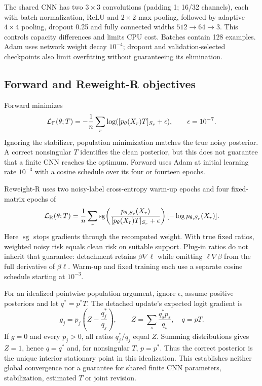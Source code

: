 \documentclass[12pt]{article}
\begin{document}
The shared CNN has two $3\times3$ convolutions (padding 1; 16/32 channels), each with batch normalization, ReLU and $2\times2$ max pooling, followed by adaptive $4\times4$ pooling, dropout 0.25 and fully connected widths $512\rightarrow64\rightarrow3$. This controls capacity differences and limits CPU cost. Batches contain 128 examples. Adam uses network weight decay $10^{-4}$; dropout and validation-selected checkpoints also limit overfitting without guaranteeing its elimination.

\subsection{Forward and Reweight-R objectives}
Forward minimizes
\begin{equation}
\mathcal L_{\rm F}(\theta;T)=-\frac1n\sum_r\log([p_\theta(X_r)T]_{S_r}+\epsilon),\qquad\epsilon=10^{-7}.
\label{eq:forward}
\end{equation}
Ignoring the stabilizer, population minimization matches the true noisy posterior. A correct nonsingular $T$ identifies the clean posterior, but this does not guarantee that a finite CNN reaches the optimum. Forward uses Adam at initial learning rate $10^{-3}$ with a cosine schedule over its four or fourteen epochs.

Reweight-R uses two noisy-label cross-entropy warm-up epochs and four fixed-matrix epochs of
\begin{equation}
\mathcal L_{\rm R}(\theta;T)=\frac1n\sum_r\operatorname{sg}\!\left(
\frac{p_{\theta,S_r}(X_r)}{[p_\theta(X_r)T]_{S_r}+\epsilon}\right)[-\log p_{\theta,S_r}(X_r)].
\label{eq:reweight}
\end{equation}
Here $\operatorname{sg}$ stops gradients through the recomputed weight. With true fixed ratios, weighted noisy risk equals clean risk on suitable support. Plug-in ratios do not inherit that guarantee: detachment retains $\beta\nabla\ell$ while omitting $\ell\nabla\beta$ from the full derivative of $\beta\ell$. Warm-up and fixed training each use a separate cosine schedule starting at $10^{-3}$.

For an idealized pointwise population argument, ignore $\epsilon$, assume positive posteriors and let $q^*=p^*T$. The detached update's expected logit gradient is
\begin{equation}
g_j=p_j\left(Z-\frac{q_j^*}{q_j}\right),\qquad
Z=\sum_s\frac{q_s^*p_s}{q_s},\quad q=pT.
\label{eq:stationary}
\end{equation}
If $g=0$ and every $p_j>0$, all ratios $q_j^*/q_j$ equal $Z$. Summing distributions gives $Z=1$, hence $q=q^*$ and, for nonsingular $T$, $p=p^*$. Thus the correct posterior is the unique interior stationary point in this idealization. This establishes neither global convergence nor a guarantee for shared finite CNN parameters, stabilization, estimated $T$ or joint revision.
\end{document}
